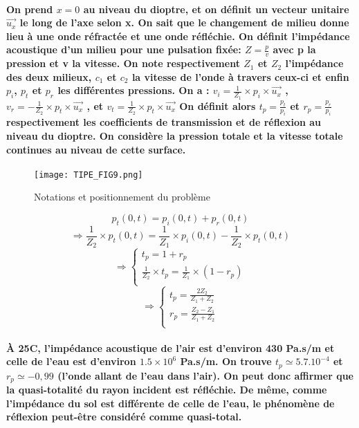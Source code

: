 \documentclass[a4paper,11pt]{article}
\begin{document}
\paragraph{\normalfont On prend $x=0$ au niveau du dioptre, et on d\'{e}finit un vecteur unitaire $\vec{u_x}$ le long de l'axe selon x. On sait que le changement de milieu donne lieu \`{a} une onde r\'{e}fract\'{e}e et une onde r\'{e}fl\'{e}chie.\newline
On d\'{e}finit l'\textbf{imp\'{e}dance acoustique d'un milieu} pour une pulsation fix\'{e}e: $Z=\frac{p}{v} $ avec p la pression et v la vitesse. On  note respectivement $Z_1$ et $Z_2$ l'imp\'{e}dance des deux milieux, $c_1$ et $c_2$ la vitesse de l'onde \`{a} travers ceux-ci et enfin $p_i$, $p_t$ et $p_r$ les diff\'{e}rentes pressions.\newline
On a : $v_i=\frac{1}{Z_1}\times p_i \times  \vec{u_x}$ ,
$v_r=-\frac{1}{Z_2}\times p_t \times  \vec{u_x}$ ,
et $v_t=\frac{1}{Z_2}\times p_t \times  \vec{u_x}$\newline
On d\'{e}finit alors $t_p=\frac{p_t}{p_i}$ et $r_p=\frac{p_r}{p_i}$ respectivement les coefficients de transmission et de r\'{e}flexion au niveau du dioptre.\newline
\textbf{On consid\`{e}re la pression totale et la vitesse totale continues au niveau de cette surface}.\newline \newline}
\begin{figure}[!h]
\texttt{[image: TIPE\_FIG9.png]}
\caption{Notations et positionnement du probl\`{e}me}
\label{fig_9}
\end{figure}
\[ p_t(0,t)=p_i(0,t)+p_r(0,t)\]
\[\Rightarrow \frac{1}{Z_2}\times p_t(0,t)=\frac{1}{Z_1}\times p_i(0,t) - \frac{1}{Z_2}\times p_t(0,t) \]
\[
  \Rightarrow \left\{
      \begin{aligned}
        t_p=1 + r_p\\
       \frac{1}{Z_2}\times t_p=\frac{1}{Z_1}\times (1-r_p) \\
      \end{aligned}
    \right.
\]
\[
  \Rightarrow \left\{
      \begin{aligned}
        t_p=\frac{2Z_2}{Z_1+Z_2}\\
       r_p=\frac{Z_2-Z_1}{Z_1+Z_2} \\
      \end{aligned}
    \right.
\]
\paragraph{\normalfont \`{A} 25\degre C, l'imp\'{e}dance acoustique de l'air est d'environ 430 Pa.s/m et celle de l'eau est d'environ $1.5\times10^6$ Pa.s/m.\newline
On trouve $t_p\simeq5.7.10^{-4}$ et $r_p\simeq-0,99$ (l'onde allant de l'eau dans l'air).\newline
On peut donc affirmer que la quasi-totalit\'{e} du rayon incident est r\'{e}fl\'{e}chie.\newline
De m\^{e}me, comme l'imp\'{e}dance du sol est diff\'{e}rente de celle de l'eau, le \textbf{ph\'{e}nom\`{e}ne de r\'{e}flexion peut-\^{e}tre consid\'{e}r\'{e} comme quasi-total.}}
\end{document}
